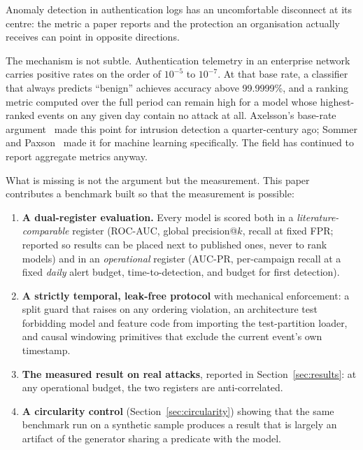 \documentclass[11pt,a4paper]{article}
\begin{document}
Anomaly detection in authentication logs has an uncomfortable disconnect at its
centre: the metric a paper reports and the protection an organisation actually
receives can point in opposite directions.

The mechanism is not subtle. Authentication telemetry in an enterprise network
carries positive rates on the order of $10^{-5}$ to $10^{-7}$. At that base rate,
a classifier that always predicts ``benign'' achieves accuracy above 99.9999\%,
and a ranking metric computed over the full period can remain high for a model
whose highest-ranked events on any given day contain no attack at all. Axelsson's
base-rate argument~\cite{axelsson2000} made this point for intrusion detection a
quarter-century ago; Sommer and Paxson~\cite{sommer2010} made it for machine
learning specifically. The field has continued to report aggregate metrics
anyway.

What is missing is not the argument but the measurement. This paper contributes
a benchmark built so that the measurement is possible:

\begin{enumerate}
  \item \textbf{A dual-register evaluation.} Every model is scored both in a
  \emph{literature-comparable} register (ROC-AUC, global precision@$k$, recall at
  fixed FPR; reported so results can be placed next to published ones, never
  to rank models) and in an \emph{operational} register (AUC-PR, per-campaign
  recall at a fixed \emph{daily} alert budget, time-to-detection, and budget for
  first detection).

  \item \textbf{A strictly temporal, leak-free protocol} with mechanical
  enforcement: a split guard that raises on any ordering violation, an
  architecture test forbidding model and feature code from importing the
  test-partition loader, and causal windowing primitives that exclude the current
  event's own timestamp.

  \item \textbf{The measured result on real attacks}, reported in
  Section~\ref{sec:results}: at any operational budget, the two registers are
  anti-correlated.

  \item \textbf{A circularity control} (Section~\ref{sec:circularity}) showing
  that the same benchmark run on a synthetic sample produces a result that is
  largely an artifact of the generator sharing a predicate with the model.
\end{enumerate}
\end{document}
